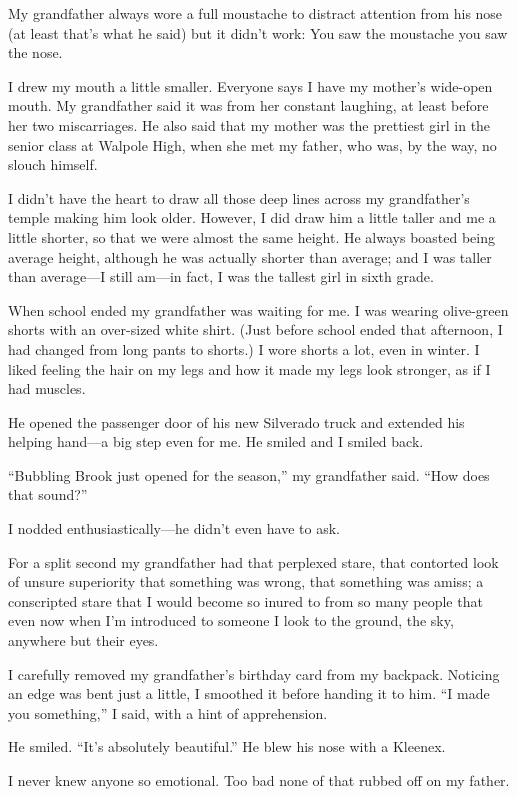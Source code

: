 My grandfather always wore a full moustache to distract attention from
his nose (at least that's what he said) but it didn't work: You saw the
moustache you saw the nose.

I drew my mouth a little smaller. Everyone says I have my mother's
wide-open mouth. My grandfather said it was from her constant laughing,
at least before her two miscarriages. He also said that my mother was
the prettiest girl in the senior class at Walpole High, when she met my
father, who was, by the way, no slouch himself.

I didn't have the heart to draw all those deep lines across my
grandfather's temple making him look older. However, I did draw him a
little taller and me a little shorter, so that we were almost the same
height. He always boasted being average height, although he was actually
shorter than average; and I was taller than average---I still am---in
fact, I was the tallest girl in sixth grade.

When school ended my grandfather was waiting for me. I was wearing
olive-green shorts with an over-sized white shirt. (Just before school
ended that afternoon, I had changed from long pants to shorts.) I wore
shorts a lot, even in winter. I liked feeling the hair on my legs and
how it made my legs look stronger, as if I had muscles.

He opened the passenger door of his new Silverado truck and extended his
helping hand---a big step even for me. He smiled and I smiled back.

``Bubbling Brook just opened for the season,'' my grandfather said.
``How does that sound?''

I nodded enthusiastically---he didn't even have to ask.

For a split second my grandfather had that perplexed stare, that
contorted look of unsure superiority that something was wrong, that
something was amiss; a conscripted stare that I would become so inured
to from so many people that even now when I'm introduced to someone I
look to the ground, the sky, anywhere but their eyes.

I carefully removed my grandfather's birthday card from my backpack.
Noticing an edge was bent just a little, I smoothed it before handing it
to him. ``I made you something,'' I said, with a hint of apprehension.

He smiled. ``It's absolutely beautiful.'' He blew his nose with a
Kleenex.

I never knew anyone so emotional. Too bad none of that rubbed off on my
father.

